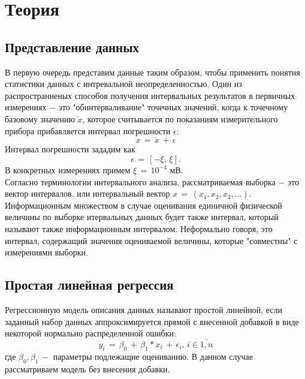 \section{Теория}
\subsection{Представление данных}
\begin{flushleft}
	В первую очередь представим данные таким образом, чтобы применить понятия статистики данных с интревальной неопределенностью. Один из распространненых способов получения интервальных результатов в первичных измерениях $-$ это "обинтерваливание" точечных значений, когда к точечному базовому значению $\dot{x}$, которое считывается по показаниям измерительного прибора прибавляется интервал погрешности $\epsilon$:
	\begin{equation}
		x \,=\, \dot{x}\,+\,\epsilon
		\label{3}
	\end{equation}
	Интервал погрешности зададим как
	\begin{equation}
		\epsilon\,=\,[-\xi,\,\xi].
		\label{4}
	\end{equation}
	В конкретных измерениях примем $\xi\,=\,10^{-4}$ мВ.\\
	Согласно терминологии интервального анализа, рассматриваемая выборка $-$ это вектор интервалов, или интервальный вектор $x \,=\, (x_1,x_2,x_3,...)$.\\
	Информационным множеством в случае оценивания единичной физической величины по выборке итервальных данных будет также интервал, который называют также информационным интервалом. Неформально говоря, это интервал, содержащий значения оцениваемой величины, которые "совместны" с измерениями выборки.
\end{flushleft}

\subsection{Простая линейная регрессия}
\begin{flushleft}
	Регрессионную модель описания данных называют простой линейной, если заданный набор данных аппроксимируется прямой с внесенной добавкой в виде некоторой нормально распределенной ошибки:
	\begin{equation}
		y_i \,=\,\beta_{0}\,+\,\beta_{1}*x_i \,+\,\epsilon_{i}, \, i\in \bar{1,n}
		\label{5}
	\end{equation}
	где $\beta_{0},\beta_{1}\,-$ параметры подлежащие оцениванию. В данном случае рассматриваем модель без внесения добавки.
\end{flushleft}

